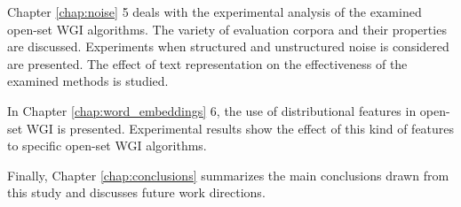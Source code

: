 Chapter \ref{chap:noise} 5 deals with the experimental analysis of the examined open-set WGI algorithms. The variety of evaluation corpora and their properties are discussed. Experiments when structured and unstructured noise is considered are presented. The effect of text representation on the effectiveness of the examined methods is studied.

In Chapter \ref{chap:word_embeddings} 6, the use of distributional features in open-set WGI is presented. Experimental results show the effect of this kind of features to specific open-set WGI algorithms. 

Finally, Chapter \ref{chap:conclusions} summarizes the main conclusions drawn from this study and discusses future work directions. 

